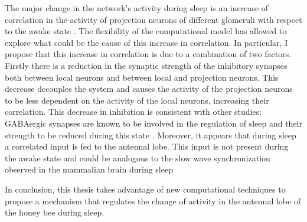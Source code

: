 The major change in the network's activity during sleep is an increase of correlation in the activity of projection neurons of different glomeruli with respect to the awake state \cite{sleep-correlates}.
The flexibility of the computational model has allowed to explore what could be the cause of this increase in correlation.
In particular, I propose that this increase in correlation is due to a combination of two factors.
Firstly there is a reduction in the synaptic strength of the inhibitory synapses both between local neurons and between local and projection neurons.
This decrease decouples the system and causes the activity of the projection neurons to be less dependent on the activity of the local neurons, increasing their correlation.
This decrease in inhibition is consistent with other studies: GABAergic synapses are known to be involved in the regulation of sleep and their strength to be reduced during this state \cite{gaba}.
Moreover, it appears that during sleep a correlated input is fed to the antennal lobe.
This input is not present during the awake state and could be analogous to the slow wave synchronization observed in the mammalian brain during sleep \cite{slow-wave-synchronization}

In conclusion, this thesis takes advantage of new computational techniques to propose a mechanism that regulates the change of activity in the antennal lobe of the honey bee during sleep.
